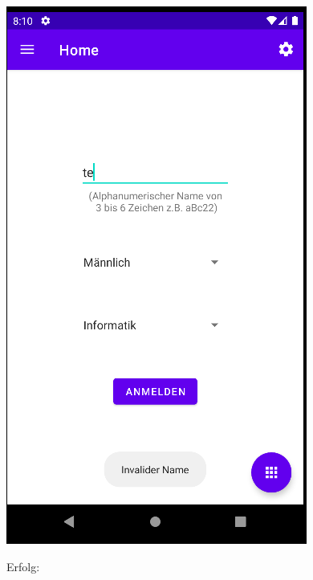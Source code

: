 \documentclass{article}
\begin{document}
\begin{center}
    \includegraphics[scale=0.45]{reg_succ.png}
\end{center}
\begin{center}
    Erfolg:
\end{center}
\end{document}
